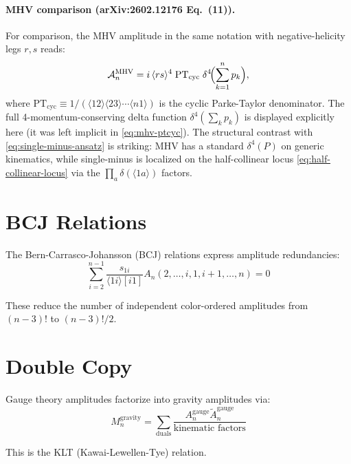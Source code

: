 \paragraph{MHV comparison (arXiv:2602.12176 Eq.~(11)).}
For comparison, the MHV amplitude in the same notation with negative-helicity legs $r,s$ reads:
\begin{equation}
\mathcal{A}_n^{\text{MHV}} = i\,\langle rs\rangle^4\;\mathrm{PT}_{\mathrm{cyc}}\;\delta^4\!\Bigl(\sum_{k=1}^n p_k\Bigr),
\label{eq:mhv-ptcyc}
\end{equation}
where $\mathrm{PT}_{\mathrm{cyc}} \equiv 1/(\langle 12\rangle\langle 23\rangle\cdots\langle n1\rangle)$ is the cyclic Parke-Taylor denominator. The full 4-momentum-conserving delta function $\delta^4(\sum_k p_k)$ is displayed explicitly here (it was left implicit in \eqref{eq:mhv-ptcyc}). The structural contrast with \eqref{eq:single-minus-ansatz} is striking: MHV has a standard $\delta^4(P)$ on generic kinematics, while single-minus is localized on the half-collinear locus \eqref{eq:half-collinear-locus} via the $\prod_a\delta(\langle 1a\rangle)$ factors.

\section{BCJ Relations}

The Bern-Carrasco-Johansson (BCJ) relations express amplitude redundancies:
\begin{equation}
\sum_{i=2}^{n-1} \frac{s_{1i}}{\langle 1i \rangle [i1]} A_n(2, \ldots, i, 1, i+1, \ldots, n) = 0
\end{equation}

These reduce the number of independent color-ordered amplitudes from $(n-3)!$ to $(n-3)!/2$.

\section{Double Copy}

Gauge theory amplitudes factorize into gravity amplitudes via:
\begin{equation}
M_n^{\text{gravity}} = \sum_{\text{duals}} \frac{A_n^{\text{gauge}} \tilde{A}_n^{\text{gauge}}}{\text{kinematic factors}}
\end{equation}

This is the KLT (Kawai-Lewellen-Tye) relation.
